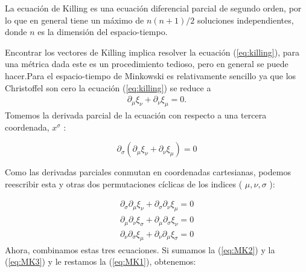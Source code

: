 \begin{note}
    La ecuación de Killing es una ecuación diferencial parcial de segundo orden, por lo que en general tiene un máximo de $n(n+1)/2$ soluciones independientes, donde $n$ es la dimensión del espacio-tiempo.
\end{note}
Encontrar los vectores de Killing implica resolver la ecuación (\ref{eq:killing}), para una métrica dada este es un procedimiento tedioso, pero en general se puede hacer.Para el espacio-tiempo de Minkowski es relativamente sencillo ya que los Christoffel son cero la ecuación (\ref{eq:killing}) se reduce a
\begin{equation}
    \begin{aligned}
        \partial_\mu \xi_\nu + \partial_\nu \xi_\mu =0.
    \end{aligned}
\end{equation}
Tomemos la derivada parcial de la ecuación con respecto a una tercera coordenada, $x^\sigma$ :

\begin{equation}
    \partial_\sigma\left(\partial_\mu \xi_\nu+\partial_\nu \xi_\mu\right)=0
\end{equation}



Como las derivadas parciales conmutan en coordenadas cartesianas, podemos reescribir esta y otras dos permutaciones cíclicas de los indices ( $\mu, \nu, \sigma$ ):

\begin{eqnarray}
    \partial_\sigma \partial_\mu \xi_\nu+\partial_\sigma \partial_\nu \xi_\mu=0 \label{eq:MK1} \\
    \partial_\mu \partial_\nu \xi_\sigma+\partial_\mu \partial_\sigma \xi_\nu=0 \label{eq:MK2} \\
    \partial_\nu \partial_\sigma \xi_\mu+\partial_\nu \partial_\mu \xi_\sigma=0 \label{eq:MK3}
\end{eqnarray}
Ahora, combinamos estas tres ecuaciones. Si sumamos la (\ref{eq:MK2}) y la (\ref{eq:MK3}) y le restamos la (\ref{eq:MK1}), obtenemos:


